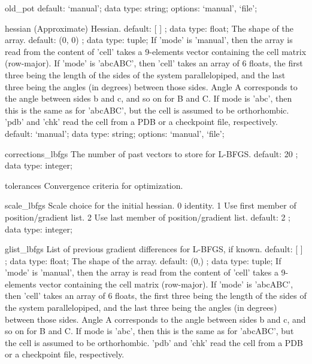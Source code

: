 \begin{ipifield}{}
\begin{ipifield}{old\_pot}
{{default: `manual'; data type: string; options: `manual', `file'; }%
}
\end{ipifield}
\begin{ipifield}{hessian}%
{(Approximate) Hessian.}%
{default:  [ ] ; data type: float; }%
{%
{The shape of the array.}%
{default:  (0, 0) ; data type: tuple; }%
%
{If 'mode' is 'manual', then the array is read from the content of 'cell' takes a 9-elements vector containing the cell matrix (row-major). If 'mode' is 'abcABC', then 'cell' takes an array of 6 floats, the first three being the length of the sides of the system parallelopiped, and the last three being the angles (in degrees) between those sides. Angle A corresponds to the angle between sides b and c, and so on for B and C. If mode is 'abc', then this is the same as for 'abcABC', but the cell is assumed to be orthorhombic. 'pdb' and 'chk' read the cell from a PDB or a checkpoint file, respectively.}%
{default: `manual'; data type: string; options: `manual', `file'; }%
}
\end{ipifield}
\begin{ipifield}{corrections\_lbfgs}%
{The number of past vectors to store for L-BFGS.}%
{default:  20 ; data type: integer; }%
{}
\end{ipifield}
\begin{ipifield}{tolerances}%
{Convergence criteria for optimization.}%
{}%
{}
\end{ipifield}
\begin{ipifield}{scale\_lbfgs}%
{Scale choice for the initial hessian.
                                                       0 identity.
                                                       1 Use first member of position/gradient list.
                                                       2 Use last  member of position/gradient list.}%
{default:  2 ; data type: integer; }%
{}
\end{ipifield}
\begin{ipifield}{glist\_lbfgs}%
{List of previous gradient differences for L-BFGS, if known.}%
{default:  [ ] ; data type: float; }%
{%
{The shape of the array.}%
{default:  (0,) ; data type: tuple; }%
%
{If 'mode' is 'manual', then the array is read from the content of 'cell' takes a 9-elements vector containing the cell matrix (row-major). If 'mode' is 'abcABC', then 'cell' takes an array of 6 floats, the first three being the length of the sides of the system parallelopiped, and the last three being the angles (in degrees) between those sides. Angle A corresponds to the angle between sides b and c, and so on for B and C. If mode is 'abc', then this is the same as for 'abcABC', but the cell is assumed to be orthorhombic. 'pdb' and 'chk' read the cell from a PDB or a checkpoint file, respectively.}%
}
\end{ipifield}
\end{ipifield}
